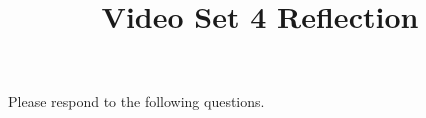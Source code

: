 \documentclass[handout]{ximera}
\title{Video Set 4 Reflection}
\begin{document}
\begin{abstract}
\end{abstract}

\maketitle

Please respond to the following questions.

\end{document}
